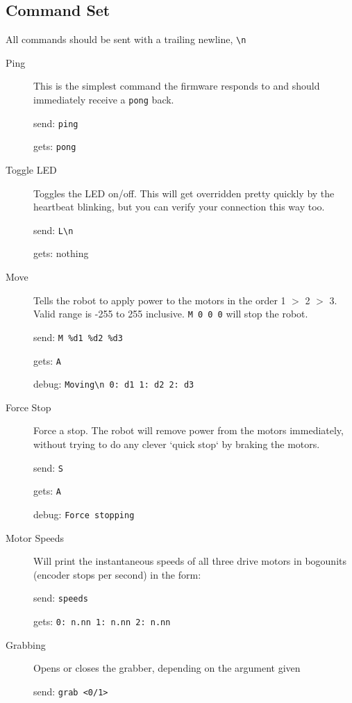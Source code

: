 \subsection{Command Set}

All commands should be sent with a trailing newline, \verb|\n|

\begin{description}

\item[Ping]
  This is the simplest command the firmware responds to and should immediately receive a \verb|pong| back.

  send: \verb|ping|
  
  gets: \verb|pong|
  

\item[Toggle LED]
  Toggles the LED on/off. This will get overridden pretty quickly by the heartbeat blinking, but you can verify your connection this way too.

  send: \verb|L\n|
  
  gets: nothing

  
\item[Move] 
  Tells the robot to apply power to the motors in the order 1 $>$ 2 $>$ 3. Valid range is -255 to 255 inclusive. \verb|M 0 0 0| will stop the robot.

  send: \verb|M %d1 %d2 %d3|
  
  gets: \verb|A|

  debug: \verb|Moving\n 0: d1 1: d2 2: d3|

  
\item[Force Stop]
  Force a stop. The robot will remove power from the motors immediately, without trying to do any clever `quick stop` by braking the motors.
  
  send: \verb|S|

  gets: \verb|A|

  debug: \verb|Force stopping|

  
\item[Motor Speeds]
  Will print the instantaneous speeds of all three drive motors in bogounits (encoder stops per second) in the form:

  send: \verb|speeds|
  
  gets: \verb|0: n.nn 1: n.nn 2: n.nn|


\item[Grabbing]
  Opens or closes the grabber, depending on the argument given

  send: \verb|grab <0/1>|


\end{description}
